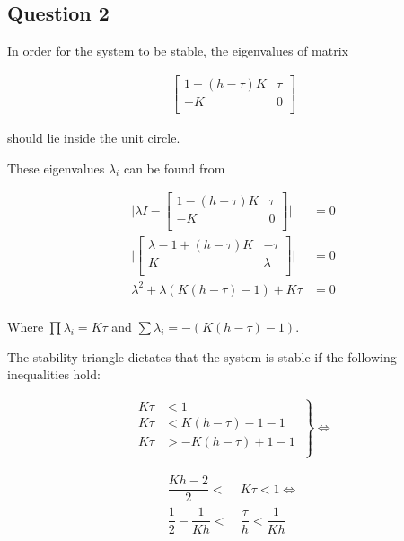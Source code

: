 \subsection{Question 2}

In order for the system to be stable, the eigenvalues of matrix

\begin{align*}
  \begin{bmatrix}
    1 - (h-\tau)K & \tau \\
    -K            & 0 \\
  \end{bmatrix}
\end{align*}

should lie inside the unit circle.

These eigenvalues $\lambda_i$ can be found from

\begin{align*}
  \Bigg| \lambda I -
  \begin{bmatrix}
    1 - (h-\tau)K & \tau \\
    -K            & 0 \\
  \end{bmatrix}
  \Bigg|
  &=  0 \\
  \Bigg|
  \begin{bmatrix}
    \lambda -1 + (h-\tau)K & -\tau \\
    K                     & \lambda \\
  \end{bmatrix}
  \Bigg|
  &= 0 \\
  \lambda^2 + \lambda (K(h-\tau)-1) + K\tau &= 0 \\
\end{align*}

Where $\prod \lambda_i = K\tau$ and $\sum \lambda_i = -(K(h-\tau)-1)$.

The stability triangle dictates that the system is stable if the following
inequalities hold:

\begin{align*}
  \left.\begin{aligned}
      K\tau &<  1 \\
      K\tau &< K(h-\tau) -1 -1 \\
      K\tau &> -K(h-\tau) +1 -1 \\
  \end{aligned}\ \right\} \Leftrightarrow
\end{align*}

\begin{align*}
  \dfrac{Kh-2}{2} < &\ K\tau < 1  \Leftrightarrow \\
  \dfrac{1}{2} - \dfrac{1}{Kh} < &\ \dfrac{\tau}{h} < \dfrac{1}{Kh}
\end{align*}

